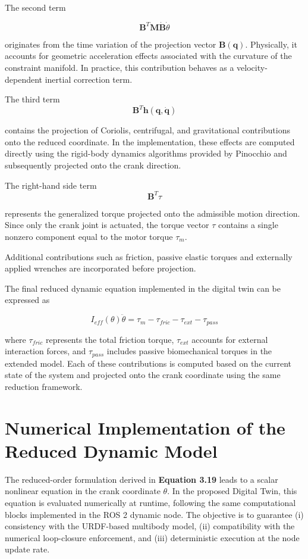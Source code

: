 The second term

\begin{equation*}
    \textbf{B}^T\textbf{M}\dot{\textbf{B}}\dot{\theta} 
\end{equation*}

originates from the time variation of the projection vector $\textbf{B}(\textbf{q})$. Physically, it accounts for geometric acceleration effects associated with the curvature of the constraint manifold. In practice, this contribution behaves as a velocity-dependent inertial correction term. 

The third term
\begin{equation*}
    \textbf{B}^T\textbf{h}(\textbf{q},\dot{\textbf{q}}) 
\end{equation*}

contains the projection of Coriolis, centrifugal, and gravitational contributions onto the reduced coordinate. In the implementation, these effects are computed directly using the rigid-body dynamics algorithms provided by Pinocchio and subsequently projected onto the crank direction.

The right-hand side term
\begin{equation*}
    \textbf{B}^T\tau
\end{equation*}

represents the generalized torque projected onto the admissible motion direction. Since only the crank joint is actuated, the torque vector $\tau$ contains a single nonzero component equal to the motor torque $\tau_{m}$. 

Additional contributions such as friction, passive elastic torques and externally applied wrenches are incorporated before projection.

The final reduced dynamic equation implemented in the digital twin can be expressed as

\begin{equation}
I_{eff}(\theta)\ddot{\theta} = \tau_{m} - \tau_{fric} - \tau_{ext} - \tau_{pass} 
\end{equation}

where $\tau_{fric}$ represents the total friction torque, $\tau_{ext}$ accounts for external interaction forces, and $\tau_{pass}$ includes passive biomechanical torques in the extended model. Each of these contributions is computed based on the current state of the system and projected onto the crank coordinate using the same reduction framework.

\section{Numerical Implementation of the Reduced Dynamic Model}
The reduced-order formulation derived in \textbf{Equation 3.19} leads to a scalar nonlinear equation in the crank coordinate $\theta$. In the proposed Digital Twin, this equation is evaluated numerically at runtime, following the same computational blocks implemented in the ROS 2 dynamic node. The objective is to guarantee (i) consistency with the URDF-based multibody model, (ii) compatibility with the numerical loop-closure enforcement, and (iii) deterministic execution at the node update rate.


